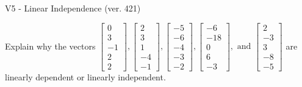 \begin{exercise}
  \begin{exerciseTitle}V5 - Linear Independence (ver. 421)\end{exerciseTitle}
  \begin{exerciseStatement}
    Explain why the vectors \(\left[\begin{array}{r}
0 \\
3 \\
-1 \\
2 \\
2
\end{array}\right] , \left[\begin{array}{r}
2 \\
3 \\
1 \\
-4 \\
-1
\end{array}\right] , \left[\begin{array}{r}
-5 \\
-6 \\
-4 \\
-3 \\
-2
\end{array}\right] , \left[\begin{array}{r}
-6 \\
-18 \\
0 \\
6 \\
-3
\end{array}\right] , \text{ and } \left[\begin{array}{r}
2 \\
-3 \\
3 \\
-8 \\
-5
\end{array}\right]\) are linearly dependent or linearly independent.	



\end{exerciseStatement}
\end{exercise}
